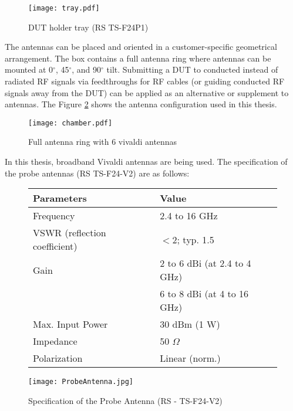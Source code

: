 \begin{figure}[H]
\centering
\texttt{[image: tray.pdf]}
\caption{ DUT holder tray (\acs{RS}\textregistered{} TS-F24P1)}
\label{fig:try}
\end{figure}

The antennas can be placed and oriented in a customer-specific geometrical arrangement. The box contains a full antenna ring where antennas can be mounted at 0$^{\circ}$, 45$^{\circ}$, and 90$^{\circ}$ tilt.  Submitting a \acs{DUT} to conducted instead of radiated \acs{RF} signals via feedthroughs for \acs{RF} cables (or guiding conducted \acs{RF} signals away from the \acs{DUT}) can be applied as an alternative or supplement to antennas. The Figure \ref{fig:box} shows the antenna configuration used in this thesis.

\begin{figure}[H]
\centering
\texttt{[image: chamber.pdf]}
\caption{Full antenna ring with 6 vivaldi antennas}
\label{fig:box}
\end{figure}

In this thesis, broadband Vivaldi antennas are being used. The specification of the probe antennas (\acs{RS}\textregistered{} TS-F24-V2) are as follows: 


\begin{figure}[h]
    \begin{minipage}[c]{.7\textwidth}%
        \begin {tabular} {|l|l|} 
\toprule
Parameters & Value \\ 
\midrule 
Frequency & 2.4 to 16 GHz \\
VSWR (reflection coefficient) & $<$2; typ. 1.5 \\
Gain & 2 to 6 dBi (at 2.4 to 4 GHz)\\ 
 & 6 to 8 dBi (at 4 to 16 GHz)\\ 
Max. Input Power & 30 dBm (1 W) \\
Impedance & 50 $\Omega$ \\
Polarization & Linear (norm.)\\
\bottomrule
\end {tabular}    \end{minipage}
    \hfill
    \begin{minipage}[c]{.2\textwidth}
        \texttt{[image: ProbeAntenna.jpg]}
    \end{minipage}
    \caption{Specification of the Probe Antenna (\acs{RS}\textregistered{} - TS-F24-V2)}
\label{fig:probes}
\end{figure}      

